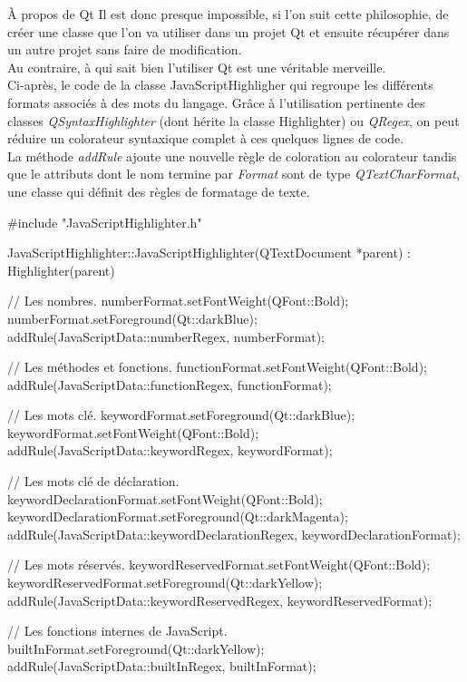 \documentclass[a4paper, 12pt]{report}
\begin{document}
\begin{chapter}
\begin{section}{À propos de Qt}
			Il est donc presque impossible, si l'on suit cette philosophie, de créer une classe que l'on va utiliser dans un projet \gls{Qt} et 
			ensuite récupérer dans un autre projet sans faire de modification.\\

			Au contraire, à qui sait bien l'utiliser \gls{Qt} est une véritable merveille.\\
			Ci-après, le code de la classe JavaScriptHighligher qui regroupe les différents formats associés à des mots du langage.
			Grâce à l'utilisation pertinente des classes \emph{QSyntaxHighlighter} (dont hérite la classe Highlighter) ou \emph{QRegex}, on peut
			réduire un colorateur syntaxique complet à ces quelques lignes de code.\\

			La méthode \emph{addRule} ajoute une nouvelle règle de coloration au colorateur tandis que le attributs dont le nom termine par
			\emph{Format} sont de type \emph{QTextCharFormat}, une classe qui définit des règles de formatage de texte.
			\begin{center}
			\begin{cppcode}
#include "JavaScriptHighlighter.h"

JavaScriptHighlighter::JavaScriptHighlighter(QTextDocument *parent)
: Highlighter(parent)
{
    // Les nombres.
    numberFormat.setFontWeight(QFont::Bold);
    numberFormat.setForeground(Qt::darkBlue);
    addRule(JavaScriptData::numberRegex, numberFormat);

    // Les méthodes et fonctions.
    functionFormat.setFontWeight(QFont::Bold);
    addRule(JavaScriptData::functionRegex, functionFormat);

    // Les mots clé.
    keywordFormat.setForeground(Qt::darkBlue);
    keywordFormat.setFontWeight(QFont::Bold);
    addRule(JavaScriptData::keywordRegex, keywordFormat);

    // Les mots clé de déclaration.
    keywordDeclarationFormat.setFontWeight(QFont::Bold);
    keywordDeclarationFormat.setForeground(Qt::darkMagenta);
    addRule(JavaScriptData::keywordDeclarationRegex, keywordDeclarationFormat);

    // Les mots réservés.
    keywordReservedFormat.setFontWeight(QFont::Bold);
    keywordReservedFormat.setForeground(Qt::darkYellow);
    addRule(JavaScriptData::keywordReservedRegex, keywordReservedFormat);

    // Les fonctions internes de JavaScript.
    builtInFormat.setForeground(Qt::darkYellow);
    addRule(JavaScriptData::builtInRegex, builtInFormat);

}
\end{cppcode}
\end{center}
\end{section}
\end{chapter}
\end{document}
